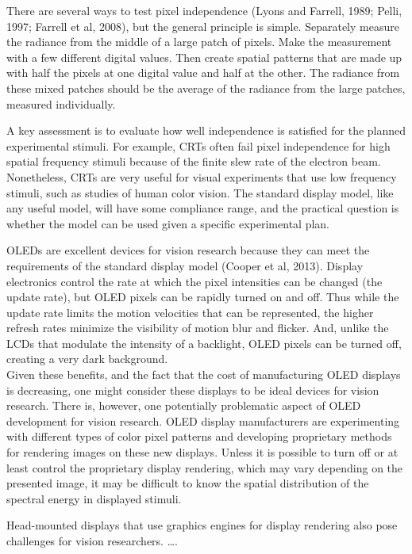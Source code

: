 \documentclass[
  letterpaper,
]{book}
\begin{document}
There are several ways to test pixel independence (Lyons and Farrell,
1989; Pelli, 1997; Farrell et al, 2008), but the general principle is
simple. Separately measure the radiance from the middle of a large patch
of pixels. Make the measurement with a few different digital values.
Then create spatial patterns that are made up with half the pixels at
one digital value and half at the other. The radiance from these mixed
patches should be the average of the radiance from the large patches,
measured individually.

A key assessment is to evaluate how well independence is satisfied for
the planned experimental stimuli. For example, CRTs often fail pixel
independence for high spatial frequency stimuli because of the finite
slew rate of the electron beam. Nonetheless, CRTs are very useful for
visual experiments that use low frequency stimuli, such as studies of
human color vision. The standard display model, like any useful model,
will have some compliance range, and the practical question is whether
the model can be used given a specific experimental plan.

OLEDs are excellent devices for vision research because they can meet
the requirements of the standard display model (Cooper et al, 2013).
Display electronics control the rate at which the pixel intensities can
be changed (the update rate), but OLED pixels can be rapidly turned on
and off. Thus while the update rate limits the motion velocities that
can be represented, the higher refresh rates minimize the visibility of
motion blur and flicker. And, unlike the LCDs that modulate the
intensity of a backlight, OLED pixels can be turned off, creating a very
dark background.\\
Given these benefits, and the fact that the cost of manufacturing OLED
displays is decreasing, one might consider these displays to be ideal
devices for vision research. There is, however, one potentially
problematic aspect of OLED development for vision research. OLED display
manufacturers are experimenting with different types of color pixel
patterns and developing proprietary methods for rendering images on
these new displays. Unless it is possible to turn off or at least
control the proprietary display rendering, which may vary depending on
the presented image, it may be difficult to know the spatial
distribution of the spectral energy in displayed stimuli.

Head-mounted displays that use graphics engines for display rendering
also pose challenges for vision researchers. \ldots.
\end{document}
